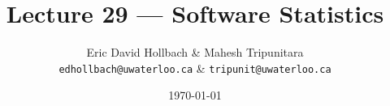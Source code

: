 
\usepackage{tikz-3dplot}

\title{Lecture 29 --- Software Statistics}

\author{Eric David Hollbach \& Mahesh Tripunitara \\ \small \texttt{edhollbach@uwaterloo.ca} \& \texttt{tripunit@uwaterloo.ca}}
\date{\today}



\begin{frame}
  \titlepage
\end{frame}


